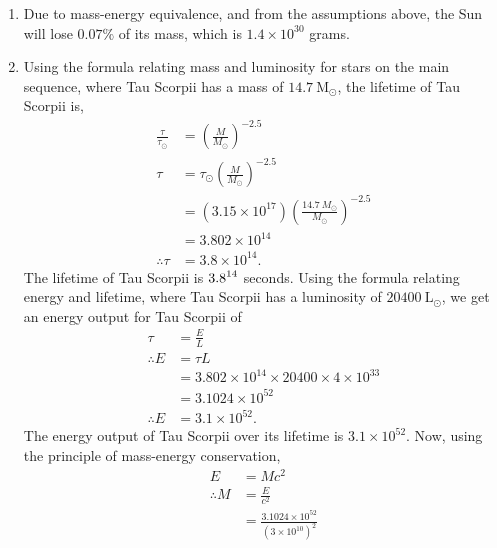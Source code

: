 \documentclass[a4paper,11pt]{article}
\newcommand{\ds}{\displaystyle}
\begin{document}
{{\begin{enumerate}[leftmargin=*]
\begin{enumerate}[label=\alph*)]
\begin{align*}
						 & = \frac{1.26 \times 10^{51}}{4\times 10^{33}} \\
						 & = 0.315 \times 10^{18} \\
					\therefore \tau & = 3.2 \times 10^{17}.
				\end{align*}
				In this scenario, the Sun would have a lifetime of $\ds{3.2 \times 10^{17}}$ seconds, or $\ds{10^{10}}$ years.
			\item Due to mass-energy equivalence, and from the assumptions above, the Sun will lose $\ds{0.07\%}$ of its mass, which is $\ds{1.4\times 10^{30}}$ grams.
				\pagebreak
			\item Using the formula relating mass and luminosity for stars on the main sequence, where Tau Scorpii has a mass of $\ds{14.7\:\text{M}_{\odot}}$, the lifetime of Tau Scorpii is,  
				\begin{align*}
					\frac{\tau}{\tau_{\odot}} & = \left(\frac{M}{M_{\odot}}\right)^{-2.5} \\
					\tau & = \tau_{\odot} \left(\frac{M}{M_{\odot}}\right)^{-2.5} \\
						 & = \left(3.15\times 10^{17}\right) \left(\frac{14.7\:M_{\odot}}{M_{\odot}}\right)^{-2.5} \\
						 & = 3.802 \times 10^{14} \\
					\therefore \tau & = 3.8 \times 10^{14}.
				\end{align*}
				The lifetime of Tau Scorpii is $\ds{3.8\time 10^{14}}$ seconds. Using the formula relating energy and lifetime, where Tau Scorpii has a luminosity of $\ds{20400\:\text{L}_{\odot}}$, we get an energy output for Tau Scorpii of
				\begin{align*}
					\tau & = \frac{E}{L} \\
					\therefore E & = \tau L \\
								 & = 3.802 \times 10^{14} \times 20400\times 4\times 10^{33} \\
								 & = 3.1024 \times 10^{52} \\
					\therefore E & = 3.1 \times 10^{52}.
				\end{align*}
				The energy output of Tau Scorpii over its lifetime is $\ds{3.1 \times 10^{52}}$. Now, using the principle of mass-energy conservation,				
				\begin{align*}
					E & = M c^2 \\
					\therefore M & = \frac{E}{c^2} \\
								 & = \frac{3.1024\times 10^{52}}{\left(3\times 10^{10}\right)^2} \\

\end{align*}
\end{enumerate}
\end{enumerate}}}
\end{document}
